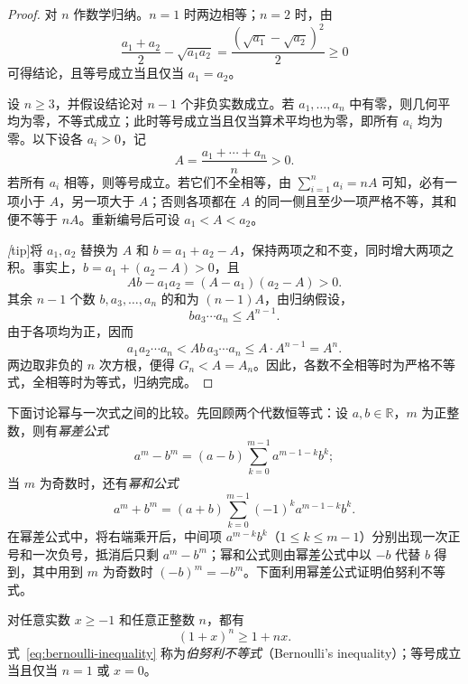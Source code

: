 \documentclass[UTF8,12pt,a4paper,fontset=fandol]{ctexbook}
\begin{document}
\begin{proof}
对 $n$ 作数学归纳。$n=1$ 时两边相等；$n=2$ 时，由
\[
    \frac{a_1+a_2}{2}-\sqrt{a_1a_2}
    =\frac{(\sqrt{a_1}-\sqrt{a_2})^2}{2}\geq 0
\]
可得结论，且等号成立当且仅当 $a_1=a_2$。

设 $n\geq 3$，并假设结论对 $n-1$ 个非负实数成立。若 $a_1,\ldots,a_n$ 中有零，则几何平均为零，不等式成立；此时等号成立当且仅当算术平均也为零，即所有 $a_i$ 均为零。以下设各 $a_i>0$，记
\[
    A=\frac{a_1+\cdots+a_n}{n}>0.
\]
若所有 $a_i$ 相等，则等号成立。若它们不全相等，由 $\sum_{i=1}^{n}a_i=nA$ 可知，必有一项小于 $A$，另一项大于 $A$；否则各项都在 $A$ 的同一侧且至少一项严格不等，其和便不等于 $nA$。重新编号后可设 $a_1<A<a_2$。

\emph[tip]{将 $a_1,a_2$ 替换为 $A$ 和 $b=a_1+a_2-A$，保持两项之和不变，同时增大两项之积。}事实上，$b=a_1+(a_2-A)>0$，且
\[
    Ab-a_1a_2=(A-a_1)(a_2-A)>0.
\]
其余 $n-1$ 个数 $b,a_3,\ldots,a_n$ 的和为 $(n-1)A$，由归纳假设，
\[
    ba_3\cdots a_n\leq A^{n-1}.
\]
由于各项均为正，因而
\[
    a_1a_2\cdots a_n
    <Ab\,a_3\cdots a_n
    \leq A\cdot A^{n-1}=A^n.
\]
两边取非负的 $n$ 次方根，便得 $G_n<A=A_n$。因此，各数不全相等时为严格不等式，全相等时为等式，归纳完成。
\end{proof}

下面讨论幂与一次式之间的比较。先回顾两个代数恒等式：设 $a,b\in\mathbb{R}$，$m$ 为正整数，则有\emph{幂差公式}
\begin{equation}
    a^m-b^m=(a-b)\sum_{k=0}^{m-1}a^{m-1-k}b^k;
    \label{eq:integer-power-difference}
\end{equation}
当 $m$ 为奇数时，还有\emph{幂和公式}
\begin{equation}
    a^m+b^m=(a+b)\sum_{k=0}^{m-1}(-1)^k a^{m-1-k}b^k.
    \label{eq:odd-integer-power-sum}
\end{equation}
在幂差公式中，将右端乘开后，中间项 $a^{m-k}b^k$（$1\leq k\leq m-1$）分别出现一次正号和一次负号，抵消后只剩 $a^m-b^m$；幂和公式则由幂差公式中以 $-b$ 代替 $b$ 得到，其中用到 $m$ 为奇数时 $(-b)^m=-b^m$。下面利用幂差公式证明伯努利不等式。

\begin{proposition}[伯努利不等式]
\label{prop:bernoulli-inequality}
对任意实数 $x\geq-1$ 和任意正整数 $n$，都有
\begin{equation}
    (1+x)^n\geq1+nx.
    \label{eq:bernoulli-inequality}
\end{equation}
式~\eqref{eq:bernoulli-inequality} 称为\emph{伯努利不等式}（Bernoulli's inequality）；等号成立当且仅当 $n=1$ 或 $x=0$。
\end{proposition}
\end{document}
